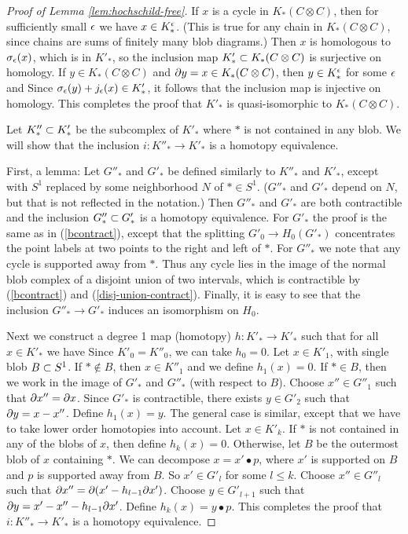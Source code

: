 \begin{proof}[Proof of Lemma \ref{lem:hochschild-free}]
If $x$ is a cycle in $K_*(C\otimes C)$, then for sufficiently small $\epsilon$ we have
$x \in K_*^\epsilon$.
(This is true for any chain in $K_*(C\otimes C)$, since chains are sums of
finitely many blob diagrams.)
Then $x$ is homologous to $\sigma_\epsilon(x)$, which is in $K'_*$, so the inclusion map
$K'_* \subset K_*(C\otimes C)$ is surjective on homology.
If $y \in K_*(C\otimes C)$ and $\partial y = x \in K_*(C\otimes C)$, then $y \in K_*^\epsilon$ for some $\epsilon$
and
Since $\sigma_\epsilon(y) + j_\epsilon(x) \in K'_*$, it follows that the inclusion map is injective on homology.
This completes the proof that $K'_*$ is quasi-isomorphic to $K_*(C\otimes C)$.

Let $K''_* \subset K'_*$ be the subcomplex of $K'_*$ where $*$ is not contained in any blob.
We will show that the inclusion $i: K''_* \to K'_*$ is a homotopy equivalence.

First, a lemma:  Let $G''_*$ and $G'_*$ be defined similarly to $K''_*$ and $K'_*$, except with
$S^1$ replaced by some neighborhood $N$ of $* \in S^1$.
($G''_*$ and $G'_*$ depend on $N$, but that is not reflected in the notation.)
Then $G''_*$ and $G'_*$ are both contractible
and the inclusion $G''_* \subset G'_*$ is a homotopy equivalence.
For $G'_*$ the proof is the same as in (\ref{bcontract}), except that the splitting
$G'_0 \to H_0(G'_*)$ concentrates the point labels at two points to the right and left of $*$.
For $G''_*$ we note that any cycle is supported away from $*$.
Thus any cycle lies in the image of the normal blob complex of a disjoint union
of two intervals, which is contractible by (\ref{bcontract}) and (\ref{disj-union-contract}).
Finally, it is easy to see that the inclusion
$G''_* \to G'_*$ induces an isomorphism on $H_0$.

Next we construct a degree 1 map (homotopy) $h: K'_* \to K'_*$ such that
for all $x \in K'_*$ we have
Since $K'_0 = K''_0$, we can take $h_0 = 0$.
Let $x \in K'_1$, with single blob $B \subset S^1$.
If $* \notin B$, then $x \in K''_1$ and we define $h_1(x) = 0$.
If $* \in B$, then we work in the image of $G'_*$ and $G''_*$ (with respect to $B$).
Choose $x'' \in G''_1$ such that $\partial x'' = \partial x$.
Since $G'_*$ is contractible, there exists $y \in G'_2$ such that $\partial y = x - x''$.
Define $h_1(x) = y$.
The general case is similar, except that we have to take lower order homotopies into account.
Let $x \in K'_k$.
If $*$ is not contained in any of the blobs of $x$, then define $h_k(x) = 0$.
Otherwise, let $B$ be the outermost blob of $x$ containing $*$.
We can decompose $x = x' \bullet p$, 
where $x'$ is supported on $B$ and $p$ is supported away from $B$.
So $x' \in G'_l$ for some $l \le k$.
Choose $x'' \in G''_l$ such that $\partial x'' = \partial (x' - h_{l-1}\partial x')$.
Choose $y \in G'_{l+1}$ such that $\partial y = x' - x'' - h_{l-1}\partial x'$.
Define $h_k(x) = y \bullet p$.
This completes the proof that $i: K''_* \to K'_*$ is a homotopy equivalence.


\end{proof}
